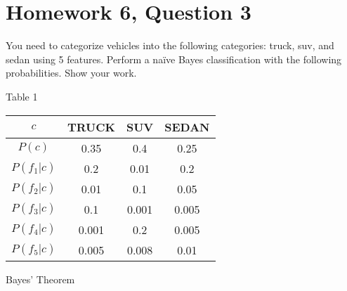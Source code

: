 \documentclass{article}
\begin{document}
\maketitle

\newcommand{\A}{x_1 \, and \, \dots \, x_n}

\makeatletter
\renewcommand{\@seccntformat}[1]{}
\makeatother

\section{Homework 6, Question 3}\label{abstract}

You need to categorize vehicles into the following categories: truck, suv, and sedan using 5 features. Perform a naïve Bayes classification with the following probabilities. Show your work.
	 	 

% 
%

\begin{center} Table 1 \end{center}

\begin{center}
 \begin{tabular}{||c c c c ||} 
 \hline
 $c$ & TRUCK & SUV & SEDAN \\ [0.5ex] 
 \hline\hline
 $P(c)$&0.35&0.4&0.25\\
 \hline
 $P(f_1|c)$&0.2&0.01&0.2\\
 \hline
 $P(f_2|c)$&0.01&0.1&0.05\\
 \hline
 $P(f_3|c)$&0.1&0.001&0.005\\
 \hline
 $P(f_4|c)$&0.001&0.2&0.005\\
 \hline
 $P(f_5|c)$ & 0.005& 0.008 & 0.01\\ [1ex] 
 \hline
\end{tabular}
\end{center}

\newcommand{\agb}[2]{P(#1|#2)}
\newcommand{\bayes}[2]{\agb{#1}{#2} = \frac{P(#1) \agb{#2}{#1}}{P(#2)}}


%
%


\begin{center} Bayes' Theorem \end{center}
\end{document}
